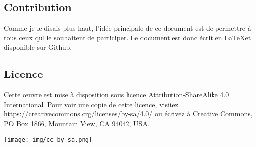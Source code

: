 \subsection{Contribution}
Comme je le disais plus haut, l’idée principale de ce document est de permettre à tous ceux qui le souhaitent de participer. Le document est donc écrit en \LaTeX et disponible sur Github.

\cite{jdrp-starwars} 
\cite{swr-git-repo}

\subsection{Licence}
Cette \oe{uvre} est mise à disposition sous licence Attribution-ShareAlike 4.0 International. Pour voir une copie de cette licence, visitez \url{https://creativecommons.org/licenses/by-sa/4.0/} ou écrivez à Creative Commons, PO Box 1866, Mountain View, CA 94042, USA.

\begin{flushright}
	\texttt{[image: img/cc-by-sa.png]}
\end{flushright}

\twocolumn
